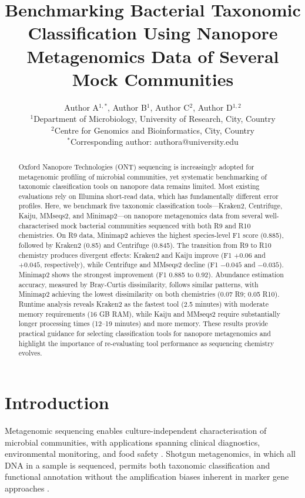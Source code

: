 \documentclass[11pt]{article}
\title{Benchmarking Bacterial Taxonomic Classification Using Nanopore Metagenomics Data of Several Mock Communities}
\author{%
  Author A$^{1,*}$, Author B$^{1}$, Author C$^{2}$, Author D$^{1,2}$ \\[6pt]
  $^{1}$Department of Microbiology, University of Research, City, Country \\
  $^{2}$Centre for Genomics and Bioinformatics, City, Country \\
  $^{*}$Corresponding author: authora@university.edu
}
\date{}
\begin{document}
\maketitle

\begin{abstract}
Oxford Nanopore Technologies (ONT) sequencing is increasingly adopted for metagenomic profiling of microbial communities, yet systematic benchmarking of taxonomic classification tools on nanopore data remains limited. Most existing evaluations rely on Illumina short-read data, which has fundamentally different error profiles. Here, we benchmark five taxonomic classification tools---Kraken2, Centrifuge, Kaiju, MMseqs2, and Minimap2---on nanopore metagenomics data from several well-characterised mock bacterial communities sequenced with both R9 and R10 chemistries. On R9 data, Minimap2 achieves the highest species-level F1 score (0.885), followed by Kraken2 (0.85) and Centrifuge (0.845). The transition from R9 to R10 chemistry produces divergent effects: Kraken2 and Kaiju improve (F1 $+0.06$ and $+0.045$, respectively), while Centrifuge and MMseqs2 decline (F1 $-0.045$ and $-0.035$). Minimap2 shows the strongest improvement (F1 0.885 to 0.92). Abundance estimation accuracy, measured by Bray-Curtis dissimilarity, follows similar patterns, with Minimap2 achieving the lowest dissimilarity on both chemistries (0.07 R9; 0.05 R10). Runtime analysis reveals Kraken2 as the fastest tool (2.5 minutes) with moderate memory requirements (16 GB RAM), while Kaiju and MMseqs2 require substantially longer processing times (12--19 minutes) and more memory. These results provide practical guidance for selecting classification tools for nanopore metagenomics and highlight the importance of re-evaluating tool performance as sequencing chemistry evolves.
\end{abstract}

\section{Introduction}

Metagenomic sequencing enables culture-independent characterisation of microbial communities, with applications spanning clinical diagnostics, environmental monitoring, and food safety \citep{quince2017,chiu2019}. Shotgun metagenomics, in which all DNA in a sample is sequenced, permits both taxonomic classification and functional annotation without the amplification biases inherent in marker gene approaches \citep{knight2018,breitwieser2019}.
\end{document}
